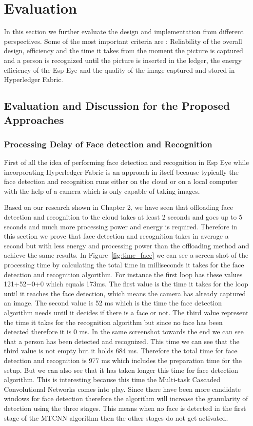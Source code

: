 \chapter{Evaluation}

In this section we further evaluate the design and implementation from different perspectives. Some of the most important criteria are : Reliability of the overall design, efficiency and the time it takes from the moment the picture is captured and a person is recognized until the picture is inserted in the ledger, the energy efficiency of the Esp Eye and the quality of the image captured and stored in Hyperledger Fabric.
\section{Evaluation and Discussion for the Proposed Approaches}

\subsection{Processing Delay of Face detection and Recognition}
First of all the idea of performing face detection and recognition in Esp Eye while incorporating Hyperledger Fabric is an approach in itself because typically the face detection and recognition runs either on the cloud or on a local computer with the help of a camera which is only capable of taking images. 

Based on our research shown in Chapter 2, we have seen that offloading face detection and recognition to the cloud takes at least 2 seconds and goes up to 5 seconds and much more processing power and energy is required. Therefore in this section we prove that face detection and recognition takes in average a second but with less energy and processing power than the offloading method and achieve the same results. In Figure~\ref{fig:time_face} we can see a screen shot of the processing time by calculating the total time in milliseconds it takes for the face detection and recognition algorithm. For instance the first loop has these values 121+52+0+0 which equals 173ms. The first value is the time it takes for the loop until it reaches the face detection, which means the camera has already captured an image. The second value is 52 ms which is the time the face detection algorithm needs until it decides if there is a face or not. The third value represent the time it takes for the recognition algorithm but since no face has been detected therefore it is 0 ms. In the same screenshot towards the end we can see that a person has been detected and recognized. This time we can see that the third value is not empty but it holds 684 ms. Therefore the total time for face detection and recognition is 977 ms which includes the preparation time for the setup. But we can also see that it has taken longer this time for face detection algorithm. This is interesting because this time the Multi-task Cascaded Convolutional Networks comes into play. Since there have been more candidate windows for face detection therefore the algorithm will increase the granularity of detection using the three stages. This means when no face is detected in the first stage of the MTCNN algorithm then the other stages do not get activated. 


